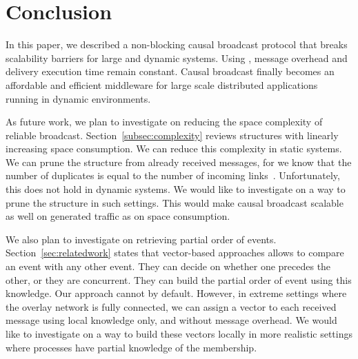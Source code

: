 
\section{Conclusion}
\label{sec:conclusion}

In this paper, we described a non-blocking causal broadcast protocol that breaks
scalability barriers for large and dynamic systems. Using \CBROADCAST, message
overhead and delivery execution time remain constant.
Causal broadcast finally becomes an affordable and efficient middleware for
large scale distributed applications running in dynamic environments.

As future work, we plan to investigate on reducing the space complexity of
reliable broadcast. Section~\ref{subsec:complexity} reviews structures with
linearly increasing space consumption. We can reduce this complexity in static
systems. We can prune the structure from already received messages, for we know
that the number of duplicates is equal to the number of incoming
links~\cite{raynal2013distributed}. Unfortunately, this does not hold in dynamic
systems. We would like to investigate on a way to prune the structure in such
settings. This would make causal broadcast scalable as well on generated traffic
as on space consumption.

We also plan to investigate on retrieving partial order of
events. Section~\ref{sec:relatedwork} states that vector-based approaches allows
to compare an event with any other event. They can decide on whether one
precedes the other, or they are concurrent. They can build the partial order of
event using this knowledge. Our approach cannot by default. However, in extreme
settings where the overlay network is fully connected, we can assign a vector to
each received message using local knowledge only, and without message
overhead. We would like to investigate on a way to build these vectors locally
in more realistic settings where processes have partial knowledge of the
membership. 

